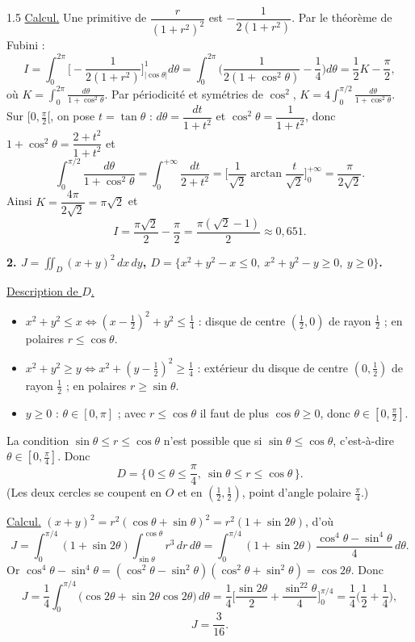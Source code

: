 \documentclass[12pt]{article}
\begin{document}
\begin{spacing}{1.5}
\underline{Calcul.} Une primitive de $\dfrac{r}{(1+r^2)^2}$ est $-\dfrac{1}{2(1+r^2)}$. Par le théorème de Fubini :
\[
I=\int_0^{2\pi}\Big[-\frac{1}{2(1+r^2)}\Big]_{|\cos\theta|}^{1}d\theta=\int_0^{2\pi}\Big(\frac{1}{2(1+\cos^2\theta)}-\frac14\Big)d\theta=\frac12K-\frac\pi2,
\]
où $K=\displaystyle\int_0^{2\pi}\frac{d\theta}{1+\cos^2\theta}$. Par périodicité et symétries de $\cos^2$, $K=4\displaystyle\int_0^{\pi/2}\frac{d\theta}{1+\cos^2\theta}$. Sur $[0,\frac\pi2[$, on pose $t=\tan\theta$ : $d\theta=\dfrac{dt}{1+t^2}$ et $\cos^2\theta=\dfrac1{1+t^2}$, donc $1+\cos^2\theta=\dfrac{2+t^2}{1+t^2}$ et
\[
\int_0^{\pi/2}\frac{d\theta}{1+\cos^2\theta}=\int_0^{+\infty}\frac{dt}{2+t^2}=\Big[\frac1{\sqrt2}\arctan\frac{t}{\sqrt2}\Big]_0^{+\infty}=\frac{\pi}{2\sqrt2}.
\]
Ainsi $K=\dfrac{4\pi}{2\sqrt2}=\pi\sqrt2$ et
\[
\boxed{I=\frac{\pi\sqrt2}{2}-\frac\pi2=\frac{\pi(\sqrt2-1)}{2}\approx0{,}651}.
\]

\textbf{2. $J=\displaystyle\iint_D(x+y)^2\,dx\,dy$, \quad $D=\{x^2+y^2-x\le0,\ x^2+y^2-y\ge0,\ y\ge0\}$.}

\underline{Description de $D$.}
\begin{itemize}
\item $x^2+y^2\le x\iff(x-\frac12)^2+y^2\le\frac14$ : disque de centre $(\frac12,0)$ de rayon $\frac12$ ; en polaires $r\le\cos\theta$.
\item $x^2+y^2\ge y\iff x^2+(y-\frac12)^2\ge\frac14$ : extérieur du disque de centre $(0,\frac12)$ de rayon $\frac12$ ; en polaires $r\ge\sin\theta$.
\item $y\ge0$ : $\theta\in[0,\pi]$ ; avec $r\le\cos\theta$ il faut de plus $\cos\theta\ge0$, donc $\theta\in[0,\frac\pi2]$.
\end{itemize}
La condition $\sin\theta\le r\le\cos\theta$ n'est possible que si $\sin\theta\le\cos\theta$, c'est-à-dire $\theta\in[0,\frac\pi4]$. Donc
\[
D=\Big\{\,0\le\theta\le\frac\pi4,\ \sin\theta\le r\le\cos\theta\,\Big\}.
\]
(Les deux cercles se coupent en $O$ et en $(\frac12,\frac12)$, point d'angle polaire $\frac\pi4$.)

\underline{Calcul.} $(x+y)^2=r^2(\cos\theta+\sin\theta)^2=r^2(1+\sin2\theta)$, d'où
\[
J=\int_0^{\pi/4}(1+\sin2\theta)\int_{\sin\theta}^{\cos\theta}r^3\,dr\,d\theta=\int_0^{\pi/4}(1+\sin2\theta)\,\frac{\cos^4\theta-\sin^4\theta}{4}\,d\theta .
\]
Or $\cos^4\theta-\sin^4\theta=(\cos^2\theta-\sin^2\theta)(\cos^2\theta+\sin^2\theta)=\cos2\theta$. Donc
\[
J=\frac14\int_0^{\pi/4}\big(\cos2\theta+\sin2\theta\cos2\theta\big)\,d\theta=\frac14\Big[\frac{\sin2\theta}{2}+\frac{\sin^22\theta}{4}\Big]_0^{\pi/4}=\frac14\Big(\frac12+\frac14\Big),
\]
\[
\boxed{J=\frac{3}{16}}.
\]


\end{spacing}
\end{document}
